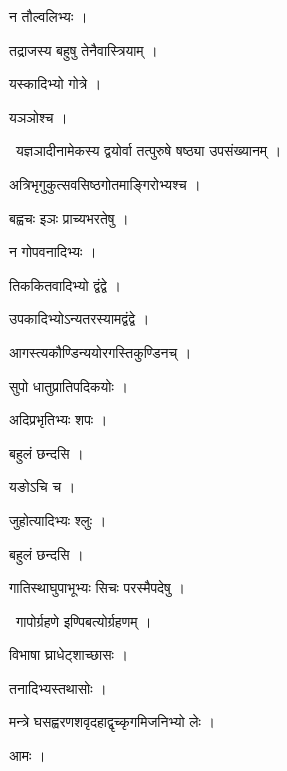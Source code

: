 \documentclass[10pt, openany, oneside]{book}
\begin{document}
\noindent न तौल्वलिभ्यः ।

\noindent तद्राजस्य बहुषु तेनैवास्त्रियाम् ।

\noindent यस्कादिभ्यो गोत्रे ।

\noindent यञञोश्च ।

\par\noindent\hspace{1.5em}{\vps वा॰}~{\qt यज्ञञादीनामेकस्य द्वयोर्वा तत्पुरुषे षष्ठ्या उपसंख्यानम् ।}

\noindent अत्रिभृगुकुत्सवसिष्ठगोतमाङ्गिरोभ्यश्च ।

\noindent बह्वचः इञः प्राच्यभरतेषु ।

\noindent न गोपवनादिभ्यः ।

\noindent तिककितवादिभ्यो द्वंद्वे ।

\noindent उपकादिभ्योऽन्यतरस्यामद्वंद्वे ।

\noindent आगस्त्यकौण्डिन्ययोरगस्तिकुण्डिनच् ।

\noindent सुपो धातुप्रातिपदिकयोः ।

\noindent अदिप्रभृतिभ्यः शपः ।

\noindent बहुलं छन्दसि ।

\noindent यङोऽचि च ।

\noindent जुहोत्यादिभ्यः श्लुः ।

\noindent बहुलं छन्दसि ।

\noindent गातिस्थाघुपाभूभ्यः सिचः परस्मैपदेषु ।

\par\noindent\hspace{1.5em}{\vps वा॰}~{\qt गापोर्ग्रहणे इण्पिबत्योर्ग्रहणम् ।}

\noindent विभाषा घ्राधेट्शाच्छासः ।

\noindent तनादिभ्यस्तथासोः ।

\noindent मन्त्रे घसह्वरणशवृदहाद्वृच्कृगमिजनिभ्यो लेः ।

\noindent आमः ।
\end{document}
